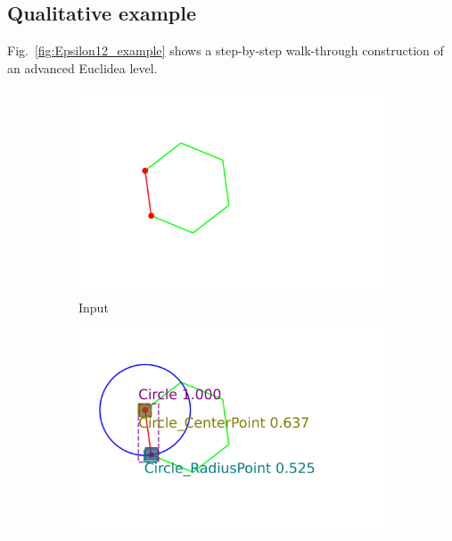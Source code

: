\newpage
\subsection{Qualitative example}

Fig.~\ref{fig:Epsilon12_example} shows a step-by-step walk-through construction of an advanced Euclidea level.

\begin{figure}[!h]
     \centering
     \begin{subfigure}[t]{0.32\textwidth}
         \centering
         \includegraphics[width=\textwidth]{img/Epsilon-12_example/input_image0.png}
         \caption{Input}
         \label{fig:Epsilo12_example_input}
     \end{subfigure}
     \hfill
     \begin{subfigure}[t]{0.32\textwidth}
         \centering
         \includegraphics[width=\textwidth]{img/Epsilon-12_example/output_image0.png}

\end{subfigure}
\end{figure}
